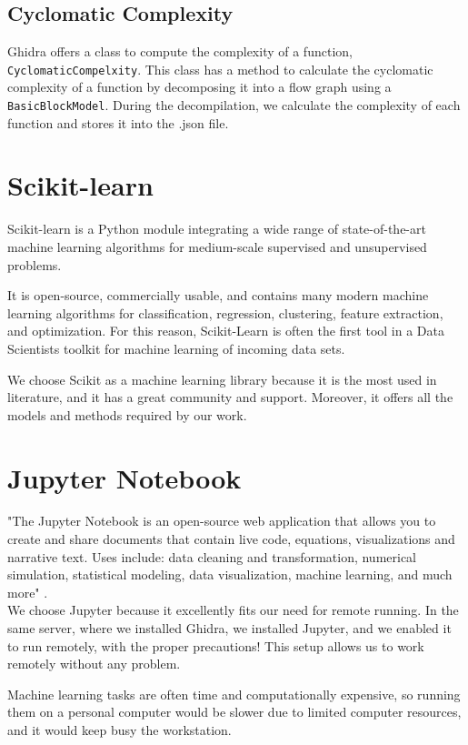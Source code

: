 \subsection{Cyclomatic Complexity}


Ghidra offers a class to compute the complexity of a function, \texttt{CyclomaticCompelxity}. This class has a method to calculate the cyclomatic complexity of a function by decomposing it into a flow graph using a \texttt{BasicBlockModel}. During the decompilation, we calculate the complexity of each function and stores it into the .json file.


\section{Scikit-learn}
Scikit-learn is a Python module integrating a wide range of state-of-the-art machine learning algorithms for medium-scale supervised and unsupervised problems. 

It is open-source, commercially usable, and contains many modern machine learning algorithms for classification, regression, clustering, feature extraction, and optimization.
For this reason, Scikit-Learn is often the first tool in a Data Scientists toolkit for machine learning of incoming data sets. \cite{scikit-learn}

We choose Scikit as a machine learning library because it is the most used in literature, and it has a great community and support. Moreover, it offers all the models and methods required by our work. 
\section{Jupyter Notebook}

"The Jupyter Notebook is an open-source web application that allows you to create and share documents that contain live code, equations, visualizations and narrative text. Uses include: data cleaning and transformation, numerical simulation, statistical modeling, data visualization, machine learning, and much more" \cite{jupyter}.\\

We choose Jupyter because it excellently fits our need for remote running. In the same server, where we installed Ghidra, we installed Jupyter, and we enabled it to run remotely, with the proper precautions! This setup allows us to work remotely without any problem. 

Machine learning tasks are often time and computationally expensive, so running them on a personal computer would be slower due to limited computer resources, and it would keep busy the workstation.
